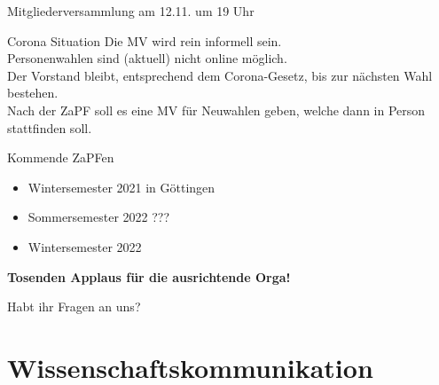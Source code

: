 \documentclass[compress, aspectratio=169]{beamer}
\begin{document}
\begin{frame}{Mitgliederversammlung am 12.11. um 19 Uhr}
  \begin{block}{Corona Situation}
    Die MV wird rein informell sein.\\
    Personenwahlen sind (aktuell) nicht online möglich.\\
    Der Vorstand bleibt, entsprechend dem Corona-Gesetz, bis zur nächsten Wahl bestehen.\\[1.5em]
    Nach der ZaPF soll es eine MV für Neuwahlen geben, welche dann in Person stattfinden soll.
  \end{block}
\end{frame}

\begin{frame}{Kommende ZaPFen}
  \begin{itemize}
    \item Wintersemester 2021 in Göttingen
    \item Sommersemester 2022 ???
    \item Wintersemester 2022 \textit{\color{blue}{bei euch?}}    
\end{itemize}
    \vspace{1cm}
    \begin{center}
      \huge \textbf{Tosenden Applaus für die ausrichtende Orga!}
    \end{center}
\end{frame}

\begin{frame}[plain]
  \begin{center}
    \Huge Habt ihr Fragen an uns?
    \end{center}
\end{frame}


\section{Wissenschaftskommunikation}
\end{document}
